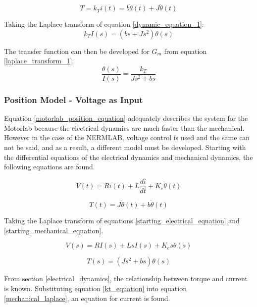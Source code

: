\begin{equation} \label{dynamic_equation_1}
T = k_T i(t) = b \dot \theta(t) + J \ddot \theta(t)
\end{equation}

Taking the Laplace transform of equation \ref{dynamic_equation_1}:
\begin{equation} \label{laplace_transform_1}
k_T I(s) = (bs + Js^2)\theta(s)
\end{equation}

The transfer function can then be developed for $G_m$ from equation \ref{laplace_transform_1}.
\begin{equation}
\label{motorlab_position_equation}
\frac{\theta(s)}{I(s)} = \frac{k_T}{Js^2 + bs}
\end{equation}


\subsubsection{Position Model - Voltage as Input}
Equation \ref{motorlab_position_equation} adequately describes the system for the Motorlab because the electrical dynamics are much faster than the mechanical. However in the case of the NERMLAB, voltage control is used and the same can not be said, and as a result, a different model must be developed. Starting with the differential equations of the electrical dynamics and mechanical dynamics, the following equations are found.

\begin{equation}
\label{starting_electrical_equation}
V(t) = Ri(t) + L\frac{di}{dt} + K_e \dot{\theta}(t)
\end{equation}

\begin{equation}
\label{starting_mechanical_equation}
T(t) = J\ddot{\theta}(t) + b \dot{\theta}(t)
\end{equation}

Taking the Laplace transform of equations \ref{starting_electrical_equation} and \ref{starting_mechanical_equation}.

\begin{equation}
\label{electrical_laplace}
V(s) = RI(s) + LsI(s) + K_e s \theta(s)
\end{equation}

\begin{equation}
\label{mechanical_laplace}
T(s) = (Js^2 + bs)\theta(s)
\end{equation}

From section \ref{electrical_dynamics}, the relationship between torque and current is known. Substituting equation \ref{kt_equation} into equation \ref{mechanical_laplace}, an equation for current is found.

